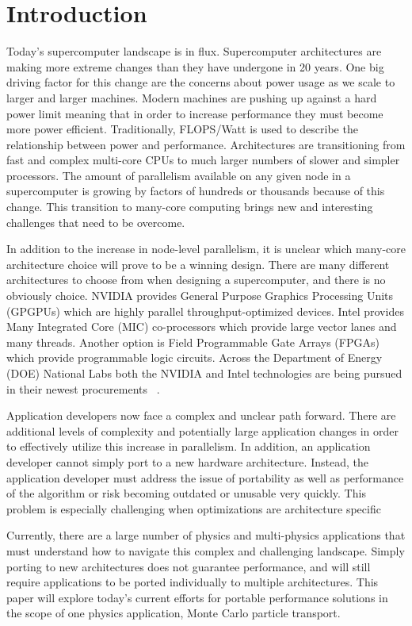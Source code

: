 \section{ \textbf{Introduction}}

Today's supercomputer landscape is in flux.
%
Supercomputer architectures are making more extreme changes than they have undergone in 20 years.
%
One big driving factor for this change are the concerns about power usage as we scale to larger and larger machines.
%
Modern machines are pushing up against a hard power limit meaning that in order to increase performance they must become more power efficient.
%
Traditionally, FLOPS/Watt is used to describe the relationship between power and performance.
%
Architectures are transitioning from fast and complex multi-core CPUs to much larger numbers of slower and simpler processors.
%
The amount of parallelism available on any given node in a supercomputer is growing by factors of hundreds or thousands because of this change.
%
This transition to many-core computing brings new and interesting challenges that need to be overcome.
%

%
In addition to the increase in node-level parallelism, it is unclear which many-core architecture choice will prove to be a winning design.
%
There are many different architectures to choose from when designing a supercomputer, and there is no obviously choice.
%
NVIDIA provides General Purpose Graphics Processing Units (GPGPUs) which are highly parallel throughput-optimized devices.
%
Intel provides Many Integrated Core (MIC) co-processors which provide large vector lanes and many threads.
%
Another option is Field Programmable Gate Arrays (FPGAs) which provide programmable logic circuits.
%
Across the Department of Energy (DOE) National Labs both the NVIDIA and Intel technologies are being pursued in their newest procurements ~\cite{coralWeb, trinityWeb}.
%

Application developers now face a complex and unclear path forward.
%
There are additional levels of complexity and potentially large application changes in order to effectively utilize this increase in parallelism.
%
In addition, an application developer cannot simply port to a new hardware architecture.
%
Instead, the application developer must address the issue of portability as well as performance of the algorithm or risk becoming outdated or unusable very quickly.
%
This problem is especially challenging when optimizations are architecture specific
%

%
Currently, there are a large number of physics and multi-physics applications that must understand how to navigate this complex and challenging landscape.
%
Simply porting to new architectures does not guarantee performance, and will still require applications to be ported individually to multiple architectures.
%
This paper will explore today's current efforts for portable performance solutions in the scope of one physics application, Monte Carlo particle transport.
%

